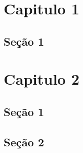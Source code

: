 \chapter{Capitulo 1} \label{capitulo1}
\lipsum[5]

\section{Seção 1}
\lipsum[6-10]
\chapter{Capitulo 2} \label{capitulo2}
\lipsum[11]
\section{Seção 1}
\lipsum[12-15]
\section{Seção 2}
\lipsum[16-20]